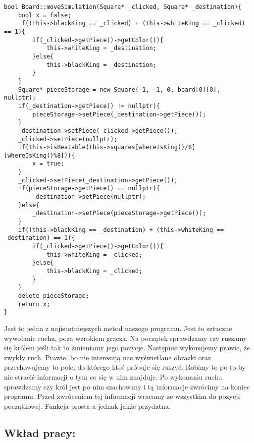 \documentclass[]{report}
\begin{document}
\begin{flushleft}
\begin{lstlisting}
bool Board::moveSimulation(Square* _clicked, Square* _destination){
	bool x = false;
	if((this->blackKing == _clicked) + (this->whiteKing == _clicked) == 1){
		if(_clicked->getPiece()->getColor()){
			this->whiteKing = _destination;
		}else{
			this->blackKing = _destination;
		}
	}
	Square* pieceStorage = new Square(-1, -1, 0, board[0][0], nullptr);
	if(_destination->getPiece() != nullptr){
		pieceStorage->setPiece(_destination->getPiece());
	}
	_destination->setPiece(_clicked->getPiece());
	_clicked->setPiece(nullptr);
	if(this->isBeatable(this->squares[whereIsKing()/8][whereIsKing()%8])){
		x = true;
	}
	_clicked->setPiece(_destination->getPiece());
	if(pieceStorage->getPiece() == nullptr){
		_destination->setPiece(nullptr);
	}else{
		_destination->setPiece(pieceStorage->getPiece());
	}
	if((this->blackKing == _destination) + (this->whiteKing == _destination) == 1){
		if(_clicked->getPiece()->getColor()){
			this->whiteKing = _clicked;
		}else{
			this->blackKing = _clicked;
		}
	}
	delete pieceStorage;
	return x;
}
\end{lstlisting}
\vspace{\baselineskip}
Jest to jedna z najistotniejszych metod naszego programu. Jest to sztuczne wywołanie ruchu, poza wzrokiem gracza. Na początek sprawdzamy czy ruszamy się królem jeśli tak to zmieniamy jego pozycje. Następnie wykonujemy prawie, że zwykły ruch. Prawie, bo nie interesują nas wyświetlane obrazki oraz przechowujemy to pole, do którego ktoś próbuje się ruszyć. Robimy to po to by nie stracić informacji o tym co się w nim znajduje. Po wykonaniu ruchu sprawdzamy czy król jest po nim szachowany i tą informacje zwrócimy na koniec programu. Przed zwróceniem tej informacji wracamy ze wszystkim do pozycji początkowej. Funkcja prosta a jednak jakże przydatna.
\vspace{\baselineskip}
\newline
\subsection*{Wkład pracy:}
\end{flushleft}
\end{document}
